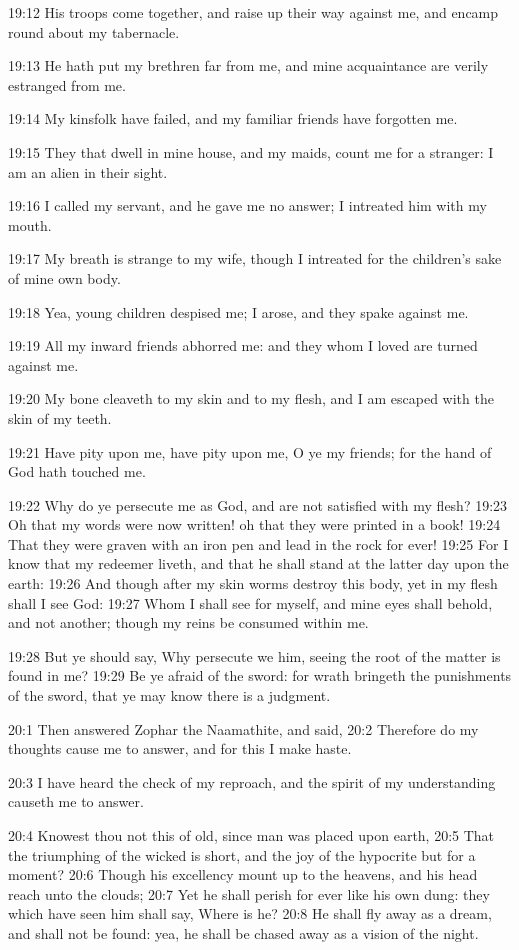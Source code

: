 19:12 His troops come together, and raise up their way against me, and
encamp round about my tabernacle.

19:13 He hath put my brethren far from me, and mine acquaintance are
verily estranged from me.

19:14 My kinsfolk have failed, and my familiar friends have forgotten
me.

19:15 They that dwell in mine house, and my maids, count me for a
stranger: I am an alien in their sight.

19:16 I called my servant, and he gave me no answer; I intreated him
with my mouth.

19:17 My breath is strange to my wife, though I intreated for the
children's sake of mine own body.

19:18 Yea, young children despised me; I arose, and they spake against
me.

19:19 All my inward friends abhorred me: and they whom I loved are
turned against me.

19:20 My bone cleaveth to my skin and to my flesh, and I am escaped
with the skin of my teeth.

19:21 Have pity upon me, have pity upon me, O ye my friends; for the
hand of God hath touched me.

19:22 Why do ye persecute me as God, and are not satisfied with my
flesh?  19:23 Oh that my words were now written! oh that they were
printed in a book!  19:24 That they were graven with an iron pen and
lead in the rock for ever!  19:25 For I know that my redeemer liveth,
and that he shall stand at the latter day upon the earth: 19:26 And
though after my skin worms destroy this body, yet in my flesh shall I
see God: 19:27 Whom I shall see for myself, and mine eyes shall
behold, and not another; though my reins be consumed within me.

19:28 But ye should say, Why persecute we him, seeing the root of the
matter is found in me?  19:29 Be ye afraid of the sword: for wrath
bringeth the punishments of the sword, that ye may know there is a
judgment.

20:1 Then answered Zophar the Naamathite, and said, 20:2 Therefore do
my thoughts cause me to answer, and for this I make haste.

20:3 I have heard the check of my reproach, and the spirit of my
understanding causeth me to answer.

20:4 Knowest thou not this of old, since man was placed upon earth,
20:5 That the triumphing of the wicked is short, and the joy of the
hypocrite but for a moment?  20:6 Though his excellency mount up to
the heavens, and his head reach unto the clouds; 20:7 Yet he shall
perish for ever like his own dung: they which have seen him shall say,
Where is he?  20:8 He shall fly away as a dream, and shall not be
found: yea, he shall be chased away as a vision of the night.

